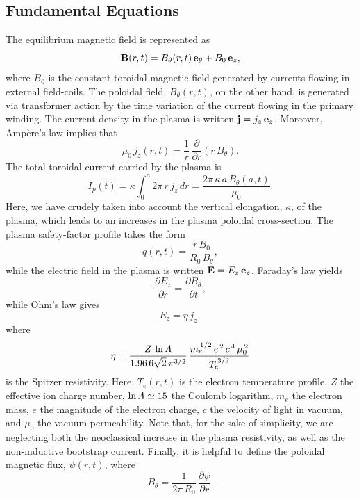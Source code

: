 \documentclass[12pt,prb,aps]{revtex4-1}
\begin{document}
\subsection{Fundamental Equations}
The equilibrium magnetic field is represented as
\begin{equation}
{\bf B}(r,t) = B_\theta(r,t)\,{\bf e}_\theta+ B_0\,{\bf e}_z,
\end{equation}
where $B_0$ is the constant toroidal magnetic field generated by  currents flowing in external  field-coils. The poloidal field, $B_\theta(r,t)$, on the other hand, is generated
via transformer action by the time variation of the current flowing in the primary winding. The current density in the plasma is written ${\bf j}= j_z\,{\bf e}_z$. Moreover, Amp\`{e}re's law implies that
\begin{equation}
\mu_0\,j_z(r,t) = \frac{1}{r}\,\frac{\partial}{\partial r}(r\,B_\theta).
\end{equation}
The total toroidal current carried by the plasma is
\begin{equation}
I_p(t)= \kappa\int_0^a 2\pi\,r\,j_z\,dr = \frac{2\pi\,\kappa\,a\,B_\theta(a,t)}{\mu_0}.
\end{equation}
Here, we have crudely taken into account the vertical elongation, $\kappa$, of the plasma, which leads to an increases in the plasma poloidal cross-section. 
The plasma safety-factor profile takes the form 
\begin{equation}
q(r,t) = \frac{r\,B_0}{R_0\,B_\theta},
\end{equation}
while the electric field in the plasma is written ${\bf E}= E_z\,{\bf e}_z$. Faraday's law yields
\begin{equation}
\frac{\partial E_z}{\partial r} = \frac{\partial B_\theta}{\partial t},
\end{equation}
while Ohm's law gives
\begin{equation}
E_z = \eta\,j_z,
\end{equation}
where
\begin{equation}
\eta = \frac{Z\,\ln{\mit\Lambda}}{1.96\,6\sqrt{2}\,\pi^{3/2}}\,\frac{m_e^{\,1/2}\,e^{\,2}\,c^{\,4}\,\mu_0^{\,2}}{T_e^{\,3/2}}
\end{equation}
is the Spitzer resistivity.\cite{spitzer,fitz} Here, $T_e(r,t)$ is the electron temperature profile, $Z$ the effective ion charge number, $\ln{\mit\Lambda}\simeq 15$ the
Coulomb logarithm, $m_e$ the electron mass, $e$ the magnitude of the electron charge, $c$ the velocity of light in vacuum, and
$\mu_0$ the vacuum permeability. Note that, for the sake of simplicity, we are neglecting both the neoclassical increase in the plasma resistivity, as well as 
the non-inductive bootstrap current.\cite{fitz1} Finally, it is helpful to define the poloidal magnetic flux, $\psi(r,t)$, where 
\begin{equation}
B_\theta =  \frac{1}{2\pi\,R_0}\,\frac{\partial\psi}{\partial r}.
\end{equation}
\end{document}
